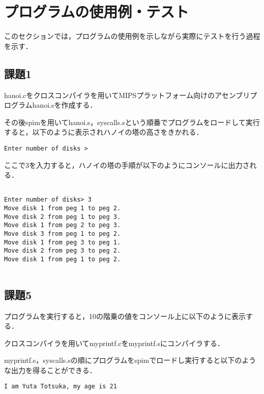 \documentclass[a4j]{jarticle}
\begin{document}
%
%

\section{プログラムの使用例・テスト}

このセクションでは，プログラムの使用例を示しながら実際にテストを行う過程を示す．

\subsection{課題1}

hanoi.cをクロスコンパイラを用いてMIPSプラットフォーム向けのアセンブリプログラムhanoi.sを作成する．　

その後spimを用いてhanoi.s，syscalls.sという順番でプログラムをロードして実行すると，以下のように表示されハノイの塔の高さをきかれる．　

{\baselineskip 3mm
\begin{verbatim}
Enter number of disks > 
\end{verbatim}
}

ここで3を入力すると，ハノイの塔の手順が以下のようにコンソールに出力される．　

{\baselineskip 3mm
\begin{verbatim}

Enter number of disks> 3
Move disk 1 from peg 1 to peg 2.
Move disk 2 from peg 1 to peg 3.
Move disk 1 from peg 2 to peg 3.
Move disk 3 from peg 1 to peg 2.
Move disk 1 from peg 3 to peg 1.
Move disk 2 from peg 3 to peg 2.
Move disk 1 from peg 1 to peg 2.
 
\end{verbatim}
}





\subsection{課題5}

プログラムを実行すると，10の階乗の値をコンソール上に以下のように表示する．

クロスコンパイラを用いてmyprintf.cをmyprintf.sにコンパイラする．　

myprintf.s，syscalls.sの順にプログラムをspimでロードし実行すると以下のような出力を得ることができる．

{\baselineskip 3mm
\begin{verbatim}
I am Yuta Totsuka, my age is 21
\end{verbatim}
}
\end{document}
